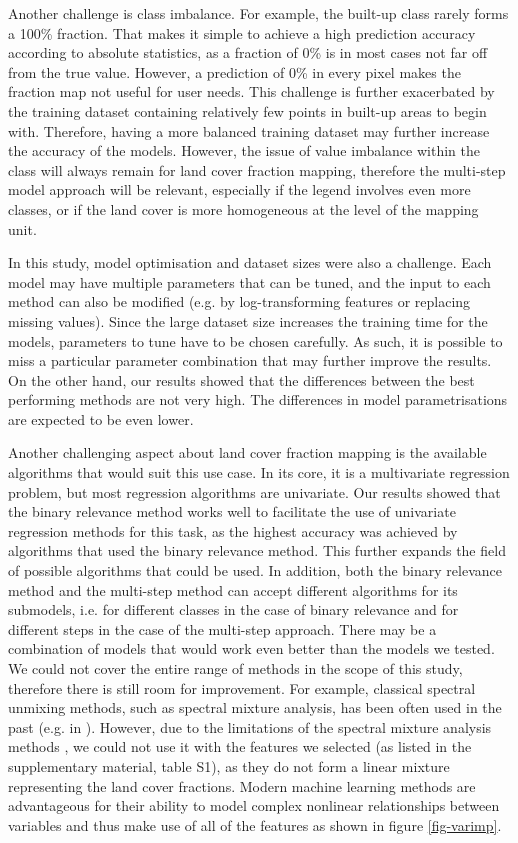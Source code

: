 \documentclass[review,authoryear,3p]{elsarticle}
\begin{document}
Another challenge is class imbalance.
For example, the built-up class rarely forms a 100\% fraction.
That makes it simple to achieve a high prediction accuracy according to absolute statistics, as a fraction of 0\% is in most cases not far off from the true value.
However, a prediction of 0\% in every pixel makes the fraction map not useful for user needs.
This challenge is further exacerbated by the training dataset containing relatively few points in built-up areas to begin with.
Therefore, having a more balanced training dataset may further increase the accuracy of the models.
However, the issue of value imbalance within the class will always remain for land cover fraction mapping, therefore the multi-step model approach will be relevant, especially if the legend involves even more classes, or if the land cover is more homogeneous at the level of the mapping unit.

In this study, model optimisation and dataset sizes were also a challenge.
Each model may have multiple parameters that can be tuned, and the input to each method can also be modified (e.g. by log-transforming features or replacing missing values).
Since the large dataset size increases the training time for the models, parameters to tune have to be chosen carefully.
As such, it is possible to miss a particular parameter combination that may further improve the results.
On the other hand, our results showed that the differences between the best performing methods are not very high.
The differences in model parametrisations are expected to be even lower.

Another challenging aspect about land cover fraction mapping is the available algorithms that would suit this use case.
In its core, it is a multivariate regression problem, but most regression algorithms are univariate.
Our results showed that the binary relevance method works well to facilitate the use of univariate regression methods for this task, as the highest accuracy was achieved by algorithms that used the binary relevance method.
This further expands the field of possible algorithms that could be used.
In addition, both the binary relevance method and the multi-step method can accept different algorithms for its submodels, i.e. for different classes in the case of binary relevance and for different steps in the case of the multi-step approach.
There may be a combination of models that would work even better than the models we tested.
We could not cover the entire range of methods in the scope of this study, therefore there is still room for improvement.
For example, classical spectral unmixing methods, such as spectral mixture analysis, has been often used in the past (e.g. in \citet{adams_classification_1995}).
However, due to the limitations of the spectral mixture analysis methods \citep{somers_endmember_2011}, we could not use it with the features we selected (as listed in the supplementary material, table S1), as they do not form a linear mixture representing the land cover fractions.
Modern machine learning methods are advantageous for their ability to model complex nonlinear relationships between variables and thus make use of all of the features as shown in figure \ref{fig-varimp}.
\end{document}
